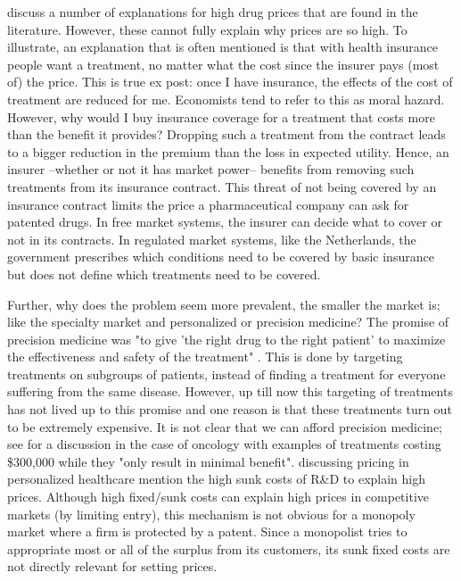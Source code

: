 \documentclass[12pt,english,a4paper]{article}
\begin{document}
\cite{Howard2015} discuss a number of explanations for high drug prices that are found in the literature. However,  these cannot fully explain why prices are so high. To illustrate, an explanation that is often mentioned is that with health insurance people want a treatment, no matter what the cost since the insurer pays (most of) the price. This is true ex post: once I have insurance, the effects of the cost of treatment are reduced for me. Economists tend to refer to this as moral hazard. However, why would I buy insurance coverage for a treatment that costs more than the benefit it provides? Dropping such a treatment from the contract leads to a bigger reduction in the premium than the loss in expected utility. Hence, an insurer --whether or not it has market power-- benefits from removing such treatments from its insurance contract. This threat of not being covered by an insurance contract limits the price a pharmaceutical company can ask for patented drugs. In free market systems, the insurer can decide what to cover or not in its contracts. In regulated market systems, like the Netherlands, the government prescribes which conditions need to be covered by basic insurance but does not define which treatments need to be covered.

Further, why does the problem seem more prevalent, the smaller the market is; like the specialty market and personalized or precision medicine? The promise of precision medicine was "to give 'the right drug to the right patient' to maximize the effectiveness and safety of the treatment" \citep{Garattini2015}. This is done by targeting treatments on subgroups of patients, instead of finding a treatment for everyone suffering from the same disease. However, up till now this targeting of treatments has not lived up to this promise and one reason is that these treatments turn out to be extremely expensive. It is not clear that we can afford precision medicine; see \cite{Doble2016} for a discussion in the case of oncology with examples of treatments costing \$300,000 while they "only result in minimal benefit". \cite{Garrison2017} discussing pricing in personalized healthcare mention the high sunk costs of R\&D to explain high prices. Although high fixed/sunk costs can explain high prices in competitive markets (by limiting entry), this mechanism is not obvious for a monopoly market where a firm is protected by a patent. Since a monopolist tries to appropriate most or all of the surplus from its customers, its sunk fixed costs are not directly relevant for setting prices.
\end{document}
